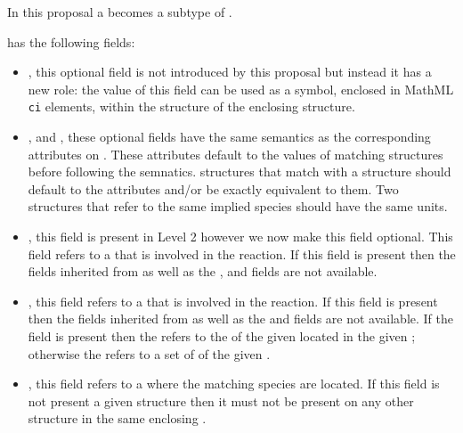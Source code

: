 \documentclass{cekarticle}
\begin{document}
In this proposal a  becomes a subtype of .

 has the following fields:

\begin{itemize}

\item {}, this optional  field is not
introduced by this proposal but instead it has a new role: the
value of this field can be used as a symbol, enclosed in MathML
\texttt{ci} elements, within the  structure of
the enclosing  structure.

\item {},  and
, these optional fields have the
same semantics as the corresponding attributes on .
These attributes default to the values of matching 
structures before following the  semnatics.
 structures that match with a
 structure should default to the 
attributes and/or be exactly equivalent to them.  Two
 structures that refer to the same
implied species should have the same units.

\item {}, this  field is present in Level 2 however we now make this field
optional.  This field refers to a  that is involved in the reaction.  If this field is
present then the fields inherited from  as well as the ,
 and  fields are not available.

\item {}, this  field refers to a  that is
involved in the reaction.  If this field is
present then the fields inherited from  as well as the
 and  fields are not available.  If the 
field is present then the  refers to the  of
the given  located in the given ; otherwise the
 refers to a set of  of the given .

\item {}, this  field refers to a
 where the matching species are located. If
this field is not present a given 
structure then it must not be present on any other
 structure in the same enclosing
.

\end{itemize}
\end{document}
